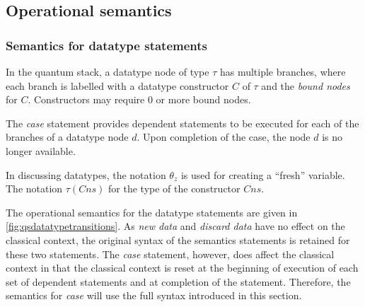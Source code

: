 \subsection{Operational semantics}
\subsubsection{Semantics for datatype statements}
In the quantum stack, a datatype node of 
type $\tau$ has multiple branches, where each branch is 
labelled with a datatype constructor $C$ of $\tau$ 
and the \emph{bound nodes} for
$C$. Constructors may require 0 or more bound nodes. 

The \emph{case} statement provides dependent statements to be executed
for each of the branches of a datatype node $d$. Upon completion of the 
case, the node $d$ is no longer available.

In discussing datatypes,  the notation $\theta_z$ is used for
 creating a ``fresh'' variable. The notation $\tau(Cns)$ for
the type of the  constructor $Cns$.

The operational semantics for the datatype statements 
  are given in \ref{fig:qsdatatypetransitions}. As \emph{new data}
and \emph{discard data} have no effect on the classical context, the 
original syntax of the semantics statements is retained for these two
statements. The
\emph{case} statement, however, does affect the classical context
in that the classical
context is reset at the beginning of execution of each set of dependent
 statements and at completion of the statement. Therefore, the semantics
for \emph{case} will use the full syntax introduced in this section.


